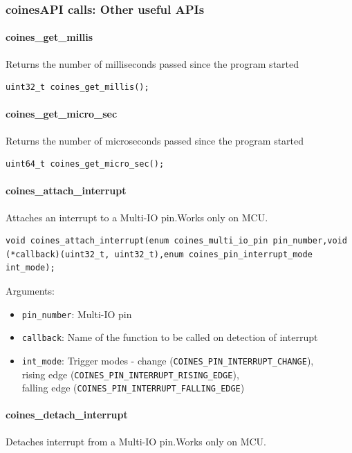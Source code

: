 \subsubsection{coinesAPI calls: Other useful APIs}
\paragraph{coines\_get\_millis}
Returns the number of milliseconds passed since the program started

\begin{lstlisting}
uint32_t coines_get_millis();
\end{lstlisting}

\paragraph{coines\_get\_micro\_sec}
Returns the number of microseconds passed since the program started

\begin{lstlisting}
uint64_t coines_get_micro_sec();
\end{lstlisting}

\paragraph{coines\_attach\_interrupt}
Attaches an interrupt to a Multi-IO pin.Works only on MCU.

\begin{lstlisting}
void coines_attach_interrupt(enum coines_multi_io_pin pin_number,void (*callback)(uint32_t, uint32_t),enum coines_pin_interrupt_mode int_mode);
\end{lstlisting}

Arguments:
\begin{itemize}
	\item \texttt{pin\_number}:  Multi-IO pin
	\item \texttt{callback}: Name of the function to be called on detection of interrupt
	\item \texttt{int\_mode}: Trigger modes - change (\texttt{COINES\_PIN\_INTERRUPT\_CHANGE}), \\
	rising edge (\texttt{COINES\_PIN\_INTERRUPT\_RISING\_EDGE}), \\falling edge (\texttt{COINES\_PIN\_INTERRUPT\_FALLING\_EDGE})
\end{itemize}

\paragraph{coines\_detach\_interrupt}
Detaches interrupt from a Multi-IO pin.Works only on MCU.

